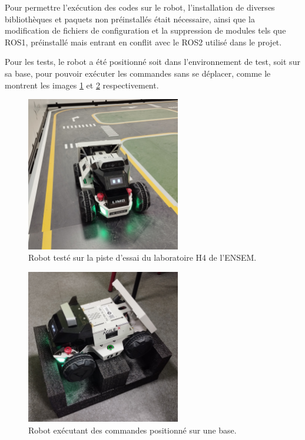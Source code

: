Pour permettre l'exécution des codes sur le robot, l'installation de diverses bibliothèques et paquets non préinstallés était nécessaire, ainsi que la modification de fichiers de configuration et la suppression de modules tels que ROS1, préinstallé mais entrant en conflit avec le ROS2 utilisé dans le projet.

Pour les tests, le robot a été positionné soit dans l'environnement de test, soit sur sa base, pour pouvoir exécuter les commandes sans se déplacer, comme le montrent les images \ref{img:track1} et \ref{img:base} respectivement.

\begin{figure}[!h]
    \centering
    \includegraphics[width=0.6\textwidth]{img/agilex/1track.jpg} 
    \caption{Robot testé sur la piste d'essai du laboratoire H4 de l'ENSEM.}
    \label{img:track1}
\end{figure}
\FloatBarrier

\begin{figure}[!h]
    \centering
    \includegraphics[width=0.6\textwidth]{img/agilex/base.jpg} 
    \caption{Robot exécutant des commandes positionné sur une base.}
    \label{img:base}
\end{figure}
\FloatBarrier

